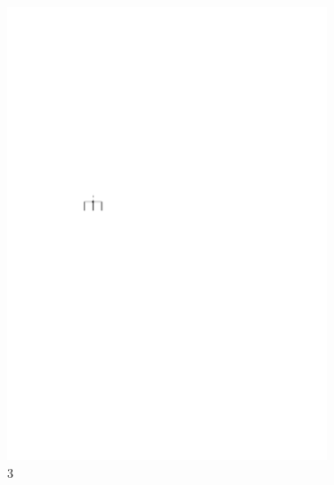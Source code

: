 \documentclass{beamer}
\begin{document}
\begin{frame}
\begin{columns}[b]
\begin{column}{2cm}
\begin{figure}[h]
                \includegraphics[scale=.8]{oc3_embed/incoming/indeg3}
                \caption{3}
        \end{figure}
\end{column}
\begin{column}{2cm}
        \begin{figure}[h]
                \centering

\end{figure}
\end{column}
\end{columns}
\end{frame}
\end{document}
